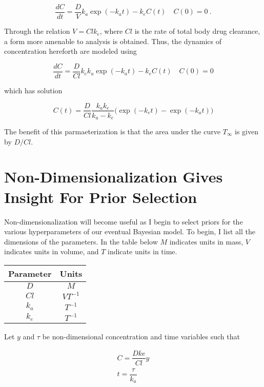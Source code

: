 \documentclass[12pt,a4paper]{book}
\begin{document}
\begin{equation}
	\dfrac{dC}{dt} = \dfrac{D}{V}k_a\exp(-k_at) - k_eC(t) \quad C(0) = 0 \>.
\end{equation}

\noindent Through the relation $ V=Clk_e $, where $ Cl $ is the rate of total body drug clearance, a form more amenable to analysis is obtained.  Thus, the dynamics of concentration hereforth are modeled using

\begin{equation}
	\dfrac{dC}{dt} = \dfrac{D}{Cl}k_ek_a\exp(-k_at) - k_eC(t) \quad C(0) = 0
\end{equation}

\noindent which has solution

\begin{equation}
C(t) = \dfrac{D}{Cl} \dfrac{k_ak_e}{k_a - k_e}\Big( \exp({-k_et}) - \exp({-k_at}) \Big)
\end{equation}

\noindent The benefit of this parmaeterization is that the area under the curve $ T_\infty $ is given by $ D/Cl $.

\section{Non-Dimensionalization Gives Insight For Prior Selection}

Non-dimensionalization will become useful as I begin to select priors for the various hyperparameters of our eventual Bayesian model.  To begin, I list all the dimensions of the parameters.  In the table below $ M $ indicates units in mass, $ V $ indicates units in volume,  and $ T $ indicate units in time.

\begin{center}
	\begin{tabular}{ |c|c| } 
		\hline
		Parameter & Units  \\
		\hline
		$ D $ &  $ M $\\
		$Cl$  & $ VT^{-1} $\\
		$ k_a $ & $ T^{-1} $\\
		$ k_e $  & $ T^{-1} $\\
		\hline
		\hline
	\end{tabular}
\end{center}

Let $ y $ and $ \tau $ be non-dimensional concentration and time variables such that 

\begin{align}
 C = \dfrac{Dke}{Cl}y \\
 t = \dfrac{\tau}{k_a}
\end{align}
\end{document}
